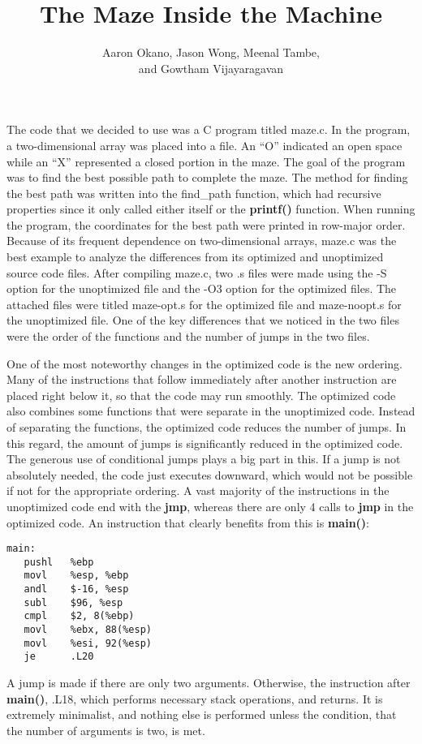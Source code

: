 \documentclass[12pt,letterpaper]{article}
\title{The Maze Inside the Machine}
\author{Aaron Okano, Jason Wong, Meenal Tambe, \\ and Gowtham Vijayaragavan}
\begin{document}
\setcounter{page}{1}
\maketitle

The code that we decided to use was a C program titled maze.c. 
In the program, a two-dimensional array was placed into a file. 
An ``O'' indicated an open space while an ``X'' represented a closed 
portion in the maze. The goal of the program was to find the best 
possible path to complete the maze. The method for finding the 
best path was written into the find\_path function, which had 
recursive properties since it only called either itself or the 
{\bf printf()} function. When running the program, the coordinates 
for the best path were printed in row-major order. Because of 
its frequent dependence on two-dimensional arrays, maze.c was 
the best example to analyze the differences from its optimized 
and unoptimized source code files. After compiling maze.c, two 
.s files were made using the -S option for the unoptimized file 
and the -O3 option for the optimized files. The attached files 
were titled maze-opt.s for the optimized file and maze-noopt.s 
for the unoptimized file. One of the key differences that we 
noticed in the two files were the order of the functions and the 
number of jumps in the two files.

One of the most noteworthy changes in the optimized code is 
the new ordering. Many of the instructions that follow 
immediately after another instruction are placed right below it, 
so that the code may run smoothly. The optimized code also 
combines some functions that were separate in the unoptimized code. 
Instead of separating the functions, the optimized code reduces 
the number of jumps. In this regard, the amount of jumps is 
significantly reduced in the optimized code. The generous use of 
conditional jumps plays a big part in this. If a jump is not 
absolutely needed, the code just executes downward, which would not 
be possible if not for the appropriate ordering. A vast majority of 
the instructions in the unoptimized code end with the {\bf jmp}, 
whereas there are only 4 calls to {\bf jmp} in the optimized code. 
An instruction that clearly benefits from this is {\bf main()}:
\begin{verbatim}
main:
   pushl   %ebp
   movl    %esp, %ebp
   andl    $-16, %esp
   subl    $96, %esp
   cmpl    $2, 8(%ebp)
   movl    %ebx, 88(%esp)
   movl    %esi, 92(%esp)
   je      .L20
\end{verbatim}
A jump is made if there are only two arguments. Otherwise, the instruction 
after {\bf main()}, .L18, which performs necessary stack operations, 
and returns. It is extremely minimalist, and nothing else is performed 
unless the condition, that the number of arguments is two, is met.
\end{document}
